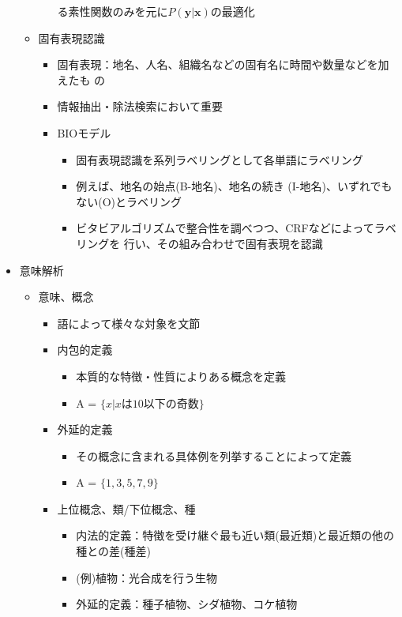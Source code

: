 \documentclass{jsarticle}
\begin{document}
\begin{itemize}
\begin{itemize}
\begin{itemize}
		     る素性関数のみを元に$P(\bm{y}|\bm{x})$の最適化
	      \end{itemize}
	\item 固有表現認識
	      \begin{itemize}
	       \item 固有表現：地名、人名、組織名などの固有名に時間や数量などを加えたも
		     の
	       \item 情報抽出・除法検索において重要
	       \item BIOモデル
		     \begin{itemize}
		      \item 固有表現認識を系列ラベリングとして各単語にラベリング
		      \item 例えば、地名の始点(B-地名)、地名の続き
			    (I-地名)、いずれでもない(O)とラベリング
		      \item ビタビアルゴリズムで整合性を調べつつ、CRFなどによってラベリングを
			    行い、その組み合わせで固有表現を認識
		     \end{itemize}
	      \end{itemize}
       \end{itemize}
 \item 意味解析
       \begin{itemize}
	\item 意味、概念
	      \begin{itemize}
	       \item 語によって様々な対象を文節
	       \item 内包的定義
		     \begin{itemize}
		      \item 本質的な特徴・性質によりある概念を定義
		      \item A = $\{x|xは10以下の奇数\}$
		     \end{itemize}
	       \item 外延的定義
		     \begin{itemize}
		      \item その概念に含まれる具体例を列挙することによって定義
		      \item A = $\{1,3,5,7,9\}$
		     \end{itemize}
	       \item 上位概念、類/下位概念、種
		     \begin{itemize}
		      \item 内法的定義：特徴を受け継ぐ最も近い類(最近類)と最近類の他の種との差(種差)
		      \item (例)植物：光合成を行う生物
		      \item 外延的定義：種子植物、シダ植物、コケ植物

\end{itemize}
\end{itemize}
\end{itemize}
\end{itemize}
\end{document}
